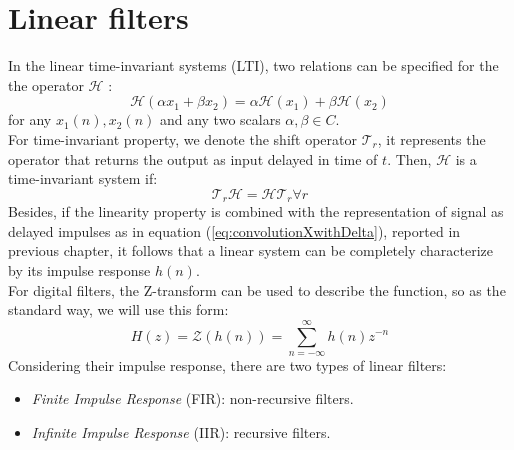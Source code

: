 \section{Linear filters}
In the linear time-invariant systems (LTI), two relations can be specified for the the operator $\mathcal{H}$ \cite{oppenheim}:
\[ \mathcal{H}(\alpha x_1 + \beta x_2) = \alpha \mathcal{H}(x_1) + \beta \mathcal{H}(x_2) \]
for any $x_1(n), x_2(n)$ and any two scalars $\alpha , \beta \in C$.\\ 
For time-invariant property, we denote the shift operator $\mathcal{T}_r$, it represents the operator that returns the output as input delayed in time of $t$. Then, $\mathcal{H}$ is a time-invariant system if:
\[ \mathcal{T}_r \mathcal{H} = \mathcal{H}  \mathcal{T}_r \forall r \]
Besides, if the linearity property is combined with the representation of signal as delayed impulses as in equation (\ref{eq:convolutionXwithDelta}), reported in previous chapter, it follows that a linear system can be completely characterize by its impulse response $h(n)$\cite{oppenheim}.\\ 
For digital filters, the Z-transform can be used to describe the function, so as the standard way, we will use this form:
\[ H(z) = \mathcal{Z}(h(n)) = \sum_{n=-\infty}^\infty h(n)z^{-n} \]
Considering their impulse response, there are two types of linear filters:
\begin{itemize}
\item \textit{Finite Impulse Response} (FIR): non-recursive filters.
\item \textit{Infinite Impulse Response} (IIR): recursive filters.
\end{itemize}

